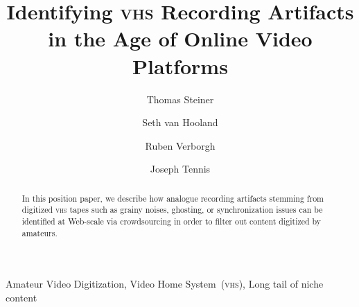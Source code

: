 \documentclass[runningheads,a4paper]{llncs}
\newcommand{\keywords}[1]{\par\addvspace\baselineskip
\noindent\keywordname\enspace\ignorespaces#1}
\begin{document}
\mainmatter

\title{Identifying {\scshape vhs} Recording Artifacts\\
in the Age of Online Video Platforms}


\author{Thomas Steiner \and
        Seth van Hooland \and
        Ruben Verborgh\and
        Joseph Tennis}


\maketitle

\setcounter{footnote}{0}

\begin{abstract}
In this position paper, we describe how analogue recording artifacts
stemming from digitized {\scshape vhs} tapes such as
grainy noises, ghosting, or synchronization issues
can be identified at Web-scale via crowdsourcing
in order to filter out content digitized by amateurs.
\end{abstract}

\keywords{Amateur Video Digitization, Video Home System~({\scshape vhs}), Long tail of niche content}
\end{document}
